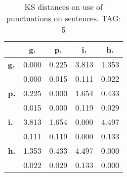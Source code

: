 \begin{table}[h!]
\begin{center}
\begin{tabular}{| l || c | c | c | c |}\hline
 & {\bf g.} & {\bf p.} & {\bf i.} & {\bf h.} \\\hline\hline
{\bf g.} & 0.000 & 0.225 & 3.813 & 1.353 \\
{\bf } & 0.000 & 0.015 & 0.111 & 0.022 \\\hline
{\bf p.} & 0.225 & 0.000 & 1.654 & 0.433 \\
{\bf } & 0.015 & 0.000 & 0.119 & 0.029 \\\hline
{\bf i.} & 3.813 & 1.654 & 0.000 & 4.497 \\
{\bf } & 0.111 & 0.119 & 0.000 & 0.133 \\\hline
{\bf h.} & 1.353 & 0.433 & 4.497 & 0.000 \\
{\bf } & 0.022 & 0.029 & 0.133 & 0.000 \\\hline
\end{tabular}
\caption{KS distances on use of punctuations on sentences. TAG: 5}
\end{center}
\end{table}